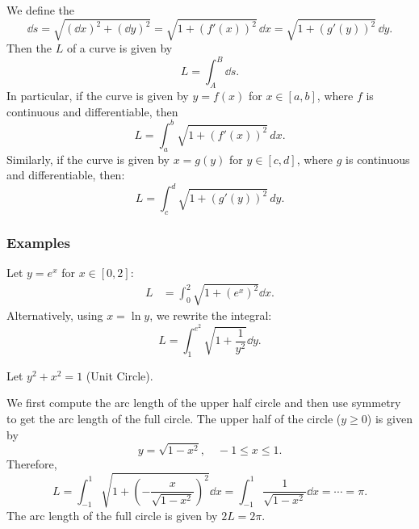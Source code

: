 \begin{defn}
    We define the  
    \[
    \dd s = \sqrt{(\dd x)^2 + (\dd y)^2} = \sqrt{1 + \left(f'(x)\right)^2} \, \dd x = \sqrt{1 + \left(g'(y)\right)^2} \, \dd y.
    \]
    Then the  $L$ of a curve is given by 
    \[L = \int_A^B \dd s. \]
    In particular, if the curve is given by $y = f(x)$ for $x \in [a, b]$, where $f$ is continuous and differentiable, then 
    \begin{equation*}
        L = \int_a^b \sqrt{1 + \left(f'(x)\right)^2} \, dx.
    \end{equation*}
    Similarly, if the curve is given by $x = g(y)$ for $y \in [c, d]$, where $g$ is continuous and differentiable, then:
    \begin{equation*}
        L = \int_c^d \sqrt{1 + \left(g'(y)\right)^2} \, dy.
    \end{equation*}

\end{defn}

\subsubsection{Examples}
\begin{ex} Let $y = e^x$ for $x \in [0, 2]$:
    \begin{align*}
        L &= \int_0^2 \sqrt{1 + \left(e^x\right)^2} \dd x.
    \end{align*}
    Alternatively, using $x = \ln y$, we rewrite the integral:
    \begin{equation*}
        L = \int_1^{e^2} \sqrt{1 + \dfrac{1}{y^2}} \dd y.
    \end{equation*}
\end{ex}

\begin{ex} Let $y^2 + x^2 = 1$ (Unit Circle).

    We first compute the arc length of the upper half circle and then use symmetry to get the arc length of the full circle. The upper half of the circle ($y \geq 0$) is given by
    \[y = \sqrt{1-x^2}, \quad -1 \leq x \leq 1. \] 
    Therefore, 
    \begin{equation*}
    L = \int_{-1}^1 \sqrt{1 + \left(-\dfrac{x}{\sqrt{1 - x^2}}\right)^2} \dd x = \int_{-1}^1 \dfrac{1}{\sqrt{1 - x^2}} \dd x = \cdots = \pi.
    \end{equation*}
    The arc length of the full circle is given by $2L = 2\pi$.
\end{ex}



